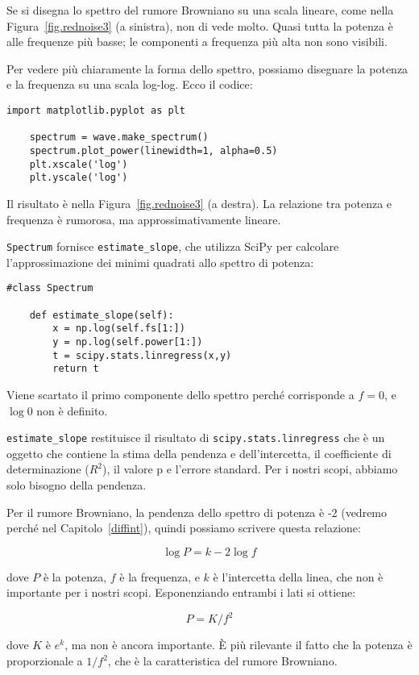 \documentclass[12pt,a4paper]{book}
\begin{document}
Se si disegna lo spettro del rumore Browniano su una scala lineare, come nella Figura~\ref{fig.rednoise3} (a sinistra), non di vede molto. Quasi tutta la potenza è alle frequenze più basse; le componenti a frequenza più alta non sono visibili.

Per vedere più chiaramente la forma dello spettro, possiamo disegnare la potenza e la frequenza su una scala log-log. Ecco il codice:

\begin{verbatim} 
import matplotlib.pyplot as plt

    spectrum = wave.make_spectrum()
    spectrum.plot_power(linewidth=1, alpha=0.5)
    plt.xscale('log')
    plt.yscale('log')
 \end{verbatim} 

Il risultato è nella Figura~\ref{fig.rednoise3} (a destra). La relazione tra potenza e frequenza è rumorosa, ma approssimativamente lineare.

{\tt Spectrum} fornisce \verb"estimate_slope", che utilizza SciPy per calcolare l'approssimazione dei minimi quadrati allo spettro di potenza:

\begin{verbatim} 
#class Spectrum

    def estimate_slope(self):
        x = np.log(self.fs[1:])
        y = np.log(self.power[1:])
        t = scipy.stats.linregress(x,y)
        return t
 \end{verbatim} 

Viene scartato il primo componente dello spettro perché corrisponde a $f=0$, e $\log 0$ non è definito.

\verb"estimate_slope" restituisce il risultato di {\tt scipy.stats.linregress} che è un oggetto che contiene la stima della pendenza e dell'intercetta, il coefficiente di determinazione ($R^2$), il valore p e l'errore standard. Per i nostri scopi, abbiamo solo bisogno della pendenza.

Per il rumore Browniano, la pendenza dello spettro di potenza è -2 (vedremo perché nel Capitolo~\ref{diffint}), quindi possiamo scrivere questa relazione:

%
\[ \log P = k -2 \log f \] 

%
dove $P$ è la potenza, $f$ è la frequenza, e $k$ è l'intercetta della linea, che non è importante per i nostri scopi. Esponenziando entrambi i lati si ottiene:

%
\[ P = K / f^{2} \] 

%
dove $K$ è $e^k$, ma non è ancora importante. È più rilevante il fatto che la potenza è proporzionale a $1/f^2$, che è la caratteristica del rumore Browniano.
\end{document}
